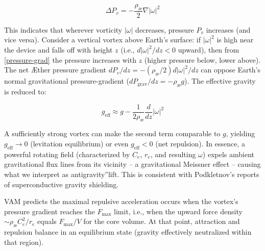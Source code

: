 \begin{equation}\label{pressure-grad}
\Delta P_v = -\frac{\rho_\text{\ae}}{2} \nabla |\omega|^2
\end{equation}

This indicates that wherever vorticity $|\omega|$ decreases, pressure $P_v$ increases (and vice versa). Consider a vertical vortex above Earth's surface: if $|\omega|^2$ is high near the device and falls off with height $z$ (i.e., $d|\omega|^2 / dz < 0$ upward), then from \eqref{pressure-grad} the pressure increases with $z$ (higher pressure below, lower above). The net Æther pressure gradient $dP_v / dz = -(\rho_\text{\ae} / 2) d|\omega|^2 / dz$ can oppose Earth's normal gravitational pressure-gradient ($dP_\text{grav} / dz = -\rho_\text{\ae} g$). The effective gravity is reduced to:

\begin{equation}\label{g-eff}
g_{\text{eff}} \approx g - \frac{1}{2 \rho_\text{\ae}} \frac{d}{dz} |\omega|^2
\end{equation}

A sufficiently strong vortex can make the second term comparable to $g$, yielding $g_{\text{eff}}\to0$ (levitation equilibrium) or even $g_{\text{eff}}<0$ (net repulsion). In essence, a powerful rotating field (characterized by $C_e$, $r_e$, and resulting $\omega$) expels ambient gravitational flux lines from its vicinity – a gravitational Meissner effect – causing what we interpret as \grqq antigravity\textquotedblright lift. This is consistent with Podkletnov's reports of superconductive gravity shielding.

VAM predicts the maximal repulsive acceleration occurs when the vortex's pressure gradient reaches the $F_{\max}$ limit, i.e., when the upward force density $\sim \rho_\text{\ae} C_e^2/r_e$ equals $F_{\max}/V$ for the core volume. At that point, attraction and repulsion balance in an equilibrium state (gravity effectively neutralized within that region).

